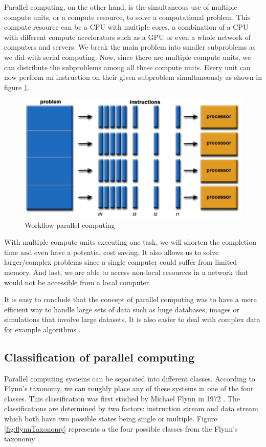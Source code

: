 \documentclass[a4paper, 11pt]{report}
\begin{document}
Parallel computing, on the other hand, is the simultaneous use of multiple compute units, or a compute resource, to solve a computational problem. This compute resource can be a CPU with multiple cores, a combination of a CPU with different compute accelorators such as a GPU or even a whole network of computers and servers. We break the main problem into smaller subproblems as we did with serial computing. Now, since there are multiple compute units, we can distribute the subproblems among all these compute units. Every unit can now perform an instruction on their given subproblem simultaneously as shown in figure \ref{fig:ParallelC}.
	\begin{figure}[ht]
		\centering
		\includegraphics[scale=.4]{images/parallelProblem.pdf}
		\caption{Workflow parallel computing}
		\label{fig:ParallelC}
	\end{figure}
With multiple compute units executing one task, we will shorten the completion time and even have a potential cost saving. It also allows us to solve larger/complex problems since a single computer could suffer from limited memory. And last, we are able to access non-local resources in a network that would not be accessible from a local computer.

It is easy to conclude that the concept of parallel computing was to have a more efficient way to handle large sets of data such as huge databases, images or simulations that involve large datasets. It is also easier to deal with complex data for example algorithms \cite{barney2012parallel}.

	\subsection{Classification of parallel computing}
Parallel computing systems can be separated into different classes. According to Flynn's taxonomy, we can roughly place any of these systems in one of the four classes. This classification was first studied by Michael Flynn in 1972 \cite{Unit2COPC}. The classifications are determined by two factors: instruction stream and data stream which both have two possible states being single or multiple. Figure \ref{fig:flynnTaxonomy} represents a the four possible classes from the Flynn's taxonomy \cite{barney2012parallel}.
\end{document}
